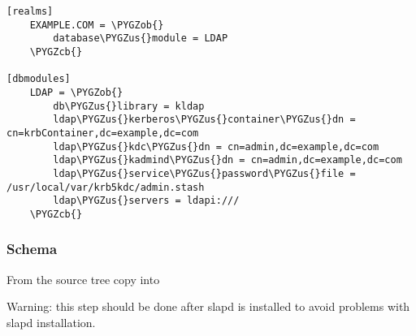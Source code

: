\documentclass[letterpaper,10pt,english]{sphinxmanual}
\def\PYGZus{\char`\_}
\def\PYGZob{\char`\{}
\def\PYGZcb{\char`\}}
\begin{document}
\begin{Verbatim}[commandchars=\\\{\}]
[realms]
    EXAMPLE.COM = \PYGZob{}
        database\PYGZus{}module = LDAP
    \PYGZcb{}

[dbmodules]
    LDAP = \PYGZob{}
        db\PYGZus{}library = kldap
        ldap\PYGZus{}kerberos\PYGZus{}container\PYGZus{}dn = cn=krbContainer,dc=example,dc=com
        ldap\PYGZus{}kdc\PYGZus{}dn = cn=admin,dc=example,dc=com
        ldap\PYGZus{}kadmind\PYGZus{}dn = cn=admin,dc=example,dc=com
        ldap\PYGZus{}service\PYGZus{}password\PYGZus{}file = /usr/local/var/krb5kdc/admin.stash
        ldap\PYGZus{}servers = ldapi:///
    \PYGZcb{}
\end{Verbatim}


\subsubsection{Schema}
\label{admin/advanced/ldapbackend:schema}
From the source tree copy
 into

Warning: this step should be done after slapd is installed to avoid
problems with slapd installation.
\end{document}
